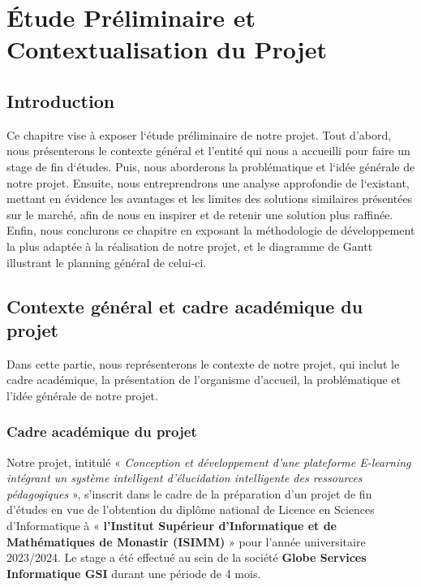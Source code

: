 \vfill 
\chapter{Étude Préliminaire et Contextualisation du Projet}
\label{chap:etude-preliminaire}
\vfill 
\minitoc
\mtcaddchapter
\vfill 

\newpage 

\section*{Introduction}
\justifying
Ce chapitre vise à exposer l`étude préliminaire de notre projet. Tout d’abord, nous présenterons le contexte général et l’entité qui nous a accueilli pour faire un stage de fin d`études. Puis, nous aborderons la problématique et l`idée générale de notre projet. Ensuite, nous entreprendrons une analyse approfondie de l`existant, mettant en évidence les avantages et les limites des solutions similaires présentées  sur le marché, afin de nous en inspirer et de retenir une solution plus raffinée. Enfin, nous conclurons ce chapitre en exposant la méthodologie de développement la plus adaptée à la réalisation de notre projet, et le diagramme de Gantt illustrant le planning général de celui-ci.
\section{Contexte général et cadre académique du projet}
\justifying
Dans cette partie, nous représenterons le contexte de notre projet, qui inclut le cadre académique, la présentation de l’organisme d’accueil, la problématique et l’idée générale de notre projet.

\subsection{Cadre académique du projet}
Notre projet, intitulé « \textit{Conception et développement d’une plateforme E-learning intégrant un système intelligent d’élucidation intelligente des ressources pédagogiques} », s’inscrit dans le cadre de la préparation d’un projet de fin d’études en vue de l’obtention du diplôme national de Licence en Sciences d’Informatique à  « \textbf{l’Institut Supérieur d’Informatique et de Mathématiques de Monastir (ISIMM)} » pour l’année universitaire 2023/2024. Le stage a été effectué au sein de la société \textbf{Globe Services Informatique GSI} durant une période de 4 mois.

